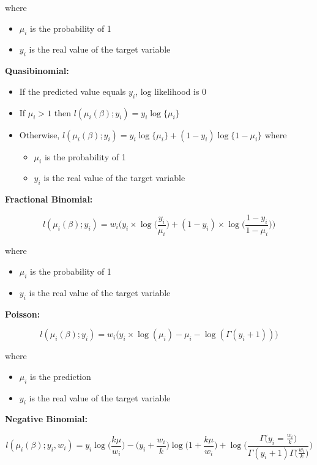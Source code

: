 where
\begin{itemize}
\item $\mu_i$ is the probability of 1
\item $y_i$ is the real value of the target variable
\end{itemize} 


\textbf{Quasibinomial:}

\begin{itemize}
\item If the predicted value equals $y_i$, log likelihood is 0
\item If $\mu_i >1$ then $l(\mu_i (\beta); y_i) = y_i \log \{ \mu_i \}$
\item Otherwise, $l(\mu_i (\beta); y_i) = y_i \log \{ \mu_i \} + (1-y_i) \log \{ 1- \mu_i \}$ where
\begin{itemize}
\item $\mu_i$ is the probability of 1
\item $y_i$ is the real value of the target variable
\end{itemize}
\end{itemize}

\textbf{Fractional Binomial:}

$$l(\mu_i (\beta); y_i) = w_i \Big(y_i \times \log \big(\frac{y_i}{\mu_i} \big) + (1-y_i) \times \log \big(\frac{1-y_i}{1-\mu_i} \big) \Big)$$

where

\begin{itemize}
\item $\mu_i$ is the probability of 1
\item $y_i$ is the real value of the target variable
\end{itemize}

\textbf{Poisson:}

$$l(\mu_i (\beta); y_i) = w_i \big(y_i \times \log (\mu_i) - \mu_i - \log (\Gamma (y_i +1)) \big)$$

where

\begin{itemize}
\item $\mu_i$ is the prediction
\item $y_i$ is the real value of the target variable
\end{itemize}

\textbf{Negative Binomial:}

$$l(\mu_i (\beta); y_i, w_i) = y_i \log \big(\frac{k \mu}{w_i} \big) - \big(y_i + \frac{w_i}{k} \big) \log \big(1 + \frac{k \mu}{w_i} \big) + \log \Big(\frac{\Gamma \big( y_i = \frac{w_i}{k} \big)} {\Gamma (y_i +1) \Gamma \big(\frac{w_i}{k}\big)} \Big)$$

